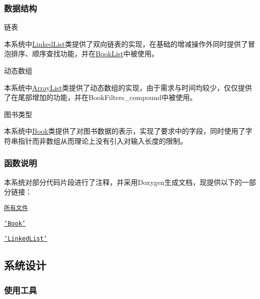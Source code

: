 \subsubsection*{数据结构}


\begin{DoxyEnumerate}
\item 链表

本系统中{\ttfamily \hyperlink{structLinkedList}{Linked\-List}}类提供了双向链表的实现，在基础的增减操作外同时提供了冒泡排序、顺序查找功能，并在{\ttfamily \hyperlink{structBookList}{Book\-List}}中被使用。
\item 动态数组

本系统中{\ttfamily \hyperlink{structArrayList}{Array\-List}}类提供了动态数组的实现，由于需求与时间均较少，仅仅提供了在尾部增加的功能，并在{\ttfamily Book\-Filters\-\_\-compound}中被使用。
\item 图书类型

本系统中{\ttfamily \hyperlink{structBook}{Book}}类提供了对图书数据的表示，实现了要求中的字段，同时使用了字符串指针而非数组从而理论上没有引入对输入长度的限制。
\end{DoxyEnumerate}

\subsubsection*{函数说明}

本系统对部分代码片段进行了注释，并采用{\ttfamily Doxygen}生成文档，现提供以下的一部分链接：


\begin{DoxyItemize}
\item \href{doxygen/html/files.html}{\tt 所有文件}
\item \href{doxygen/html/Book_8c.html}{\tt `\-Book`}
\item \href{doxygen/html/LinkedList_8c.html}{\tt `\-Linked\-List`}
\end{DoxyItemize}

\subsection*{系统设计}

\subsubsection*{使用工具}



